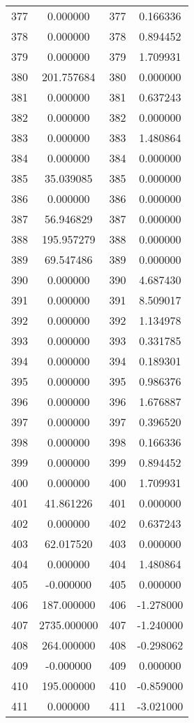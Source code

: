 \documentclass[12pt]{article}
\begin{document}
\begin{longtable}{@{}cccc@{}}
377 & 0.000000 & 377 & 0.166336 \\
378 & 0.000000 & 378 & 0.894452 \\
379 & 0.000000 & 379 & 1.709931 \\
380 & 201.757684 & 380 & 0.000000 \\
381 & 0.000000 & 381 & 0.637243 \\
382 & 0.000000 & 382 & 0.000000 \\
383 & 0.000000 & 383 & 1.480864 \\
384 & 0.000000 & 384 & 0.000000 \\
385 & 35.039085 & 385 & 0.000000 \\
386 & 0.000000 & 386 & 0.000000 \\
387 & 56.946829 & 387 & 0.000000 \\
388 & 195.957279 & 388 & 0.000000 \\
389 & 69.547486 & 389 & 0.000000 \\
390 & 0.000000 & 390 & 4.687430 \\
391 & 0.000000 & 391 & 8.509017 \\
392 & 0.000000 & 392 & 1.134978 \\
393 & 0.000000 & 393 & 0.331785 \\
394 & 0.000000 & 394 & 0.189301 \\
395 & 0.000000 & 395 & 0.986376 \\
396 & 0.000000 & 396 & 1.676887 \\
397 & 0.000000 & 397 & 0.396520 \\
398 & 0.000000 & 398 & 0.166336 \\
399 & 0.000000 & 399 & 0.894452 \\
400 & 0.000000 & 400 & 1.709931 \\
401 & 41.861226 & 401 & 0.000000 \\
402 & 0.000000 & 402 & 0.637243 \\
403 & 62.017520 & 403 & 0.000000 \\
404 & 0.000000 & 404 & 1.480864 \\
405 & -0.000000 & 405 & 0.000000 \\
406 & 187.000000 & 406 & -1.278000 \\
407 & 2735.000000 & 407 & -1.240000 \\
408 & 264.000000 & 408 & -0.298062 \\
409 & -0.000000 & 409 & 0.000000 \\
410 & 195.000000 & 410 & -0.859000 \\
411 & 0.000000 & 411 & -3.021000 \\

\end{longtable}
\end{document}
